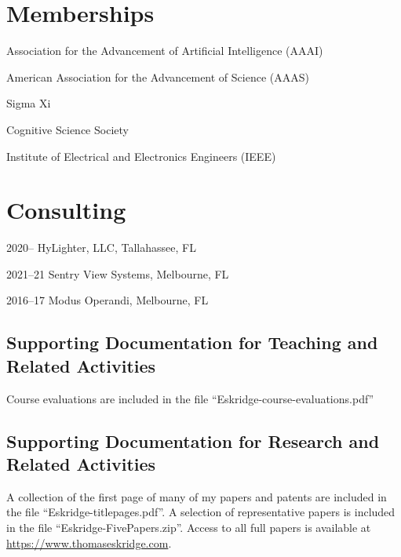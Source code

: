 \documentclass[12pt,letterpaper]{report}
\newcommand{\listitemspace}{0.25em}
\renewenvironment{itemize}
{\begin{list}{}{\setlength{\leftmargin}{0em}
                \setlength{\parskip}{0em}
                \setlength{\itemsep}{\listitemspace}
                \setlength{\parsep}{\listitemspace}}}
{\end{list}}
\begin{document}
\begin{itemize}
    \end{itemize}

    \section*{Memberships}

    \begin{itemize}

        \item Association for the Advancement of Artificial Intelligence (AAAI)
        \item American Association for the Advancement of Science (AAAS)
        \item Sigma Xi
        \item Cognitive Science Society
        \item Institute of Electrical and Electronics Engineers (IEEE)
    \end{itemize}



    \section*{Consulting}

    \begin{tablist}
        \item[2020--  ] \tab{}HyLighter, LLC, Tallahassee, FL
        \item[2021--21] \tab{}Sentry View Systems, Melbourne, FL
        \item[2016--17] \tab{}Modus Operandi, Melbourne, FL
    \end{tablist}

\subsection*{Supporting Documentation for Teaching and Related Activities}
Course evaluations are included in the file ``Eskridge-course-evaluations.pdf''

\subsection*{Supporting Documentation for Research and Related Activities}
A collection of the first page of many of my papers and patents are included in the file ``Eskridge-titlepages.pdf''.  A selection of representative papers is included in the file ``Eskridge-FivePapers.zip''.  Access to all full papers is available at \url{https://www.thomaseskridge.com}.
\end{document}
